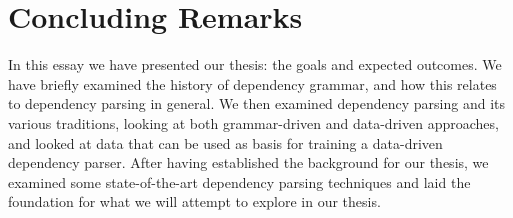 \documentclass[10pt]{article}
\begin{document}
\section{Concluding Remarks}
In this essay we have presented our thesis: the goals and expected outcomes. We have briefly examined the history of dependency grammar, and how this relates to dependency parsing in general. We then examined dependency parsing and its various traditions, looking at both grammar-driven and data-driven approaches, and looked at data that can be used as basis for training a data-driven dependency parser. After having established the background for our thesis, we examined some state-of-the-art dependency parsing techniques and laid the foundation for what we will attempt to explore in our thesis.


\printbibliography
\end{document}
